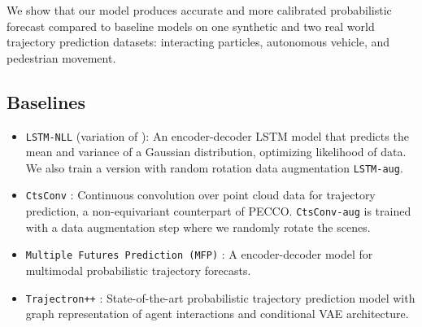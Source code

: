 
We show that our model produces accurate and more calibrated probabilistic forecast compared to baseline models on one synthetic and two real world trajectory prediction datasets: interacting particles, autonomous vehicle, and pedestrian movement. 
\subsection{Baselines}
\begin{itemize}
\itemsep0em 
   \item \texttt{LSTM-NLL} (variation of \cite{sociallstm}): An encoder-decoder LSTM model that predicts the mean and variance of a Gaussian distribution, optimizing likelihood of data. We also train a version with random rotation data augmentation \texttt{LSTM-aug}.
    \item \texttt{CtsConv} \cite{ummenhofer2019lagrangian}: Continuous convolution over point cloud data for trajectory prediction, a non-equivariant counterpart of PECCO. \texttt{CtsConv-aug} is trained with a data augmentation step where we randomly rotate the scenes. 
     \item \texttt{Multiple Futures Prediction (MFP)} \cite{mfp}: A encoder-decoder model for multimodal probabilistic trajectory forecasts.
     \item \texttt{Trajectron++} \cite{trajectron++}: State-of-the-art probabilistic trajectory prediction model with graph representation of agent interactions and conditional VAE architecture.
\end{itemize}

